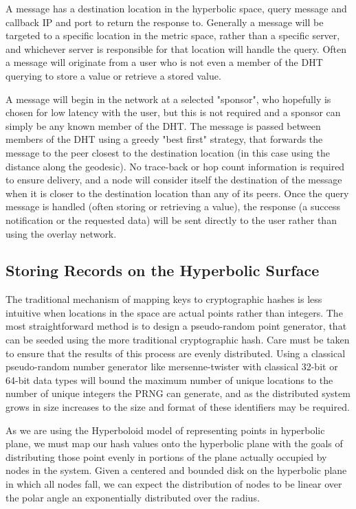 A message has a destination location in the hyperbolic space, query message and callback IP and port to return the response to.
Generally a message will be targeted to a specific location in the metric space, rather than a specific server, and whichever server is responsible for that location will handle the query.
Often a message will originate from a user who is not even a member of the DHT querying to store a value or retrieve a stored value.

A message will begin in the network at a selected "sponsor", who hopefully is chosen for low latency with the user, but this is not required and a sponsor can simply be any known member of the DHT.
The message is passed between members of the DHT using a greedy "best first" strategy, that forwards the message to the peer closest to the destination location (in this case using the distance along the geodesic).
No trace-back or hop count information is required to ensure delivery, and a node will consider itself the destination of the message when it is closer to the destination location than any of its peers.
Once the query message is handled (often storing or retrieving a value), the response (a success notification or the requested data) will be sent directly to the user rather than using the overlay network.


\subsection{Storing Records on the Hyperbolic Surface}

The traditional mechanism of mapping keys to cryptographic hashes is less intuitive when locations in the space are actual points rather than integers.
The most straightforward method is to design a pseudo-random point generator, that can be seeded using the more traditional cryptographic hash.
Care must be taken to ensure that the results of this process are evenly distributed.
Using a classical pseudo-random number generator like mersenne-twister with classical 32-bit or 64-bit data types will bound the maximum number of unique locations to the number of unique integers the PRNG can generate, and as the distributed system grows in size increases to the size and format of these identifiers may be required.

As we are using the Hyperboloid model of representing points in hyperbolic plane, we must map our hash values onto the hyperbolic plane with the goals of distributing those point evenly in portions of the plane actually occupied by nodes in the system.
Given a centered and bounded disk on the hyperbolic plane in which all nodes fall, we can expect the distribution of nodes to be linear over the polar angle an exponentially distributed over the radius. 


